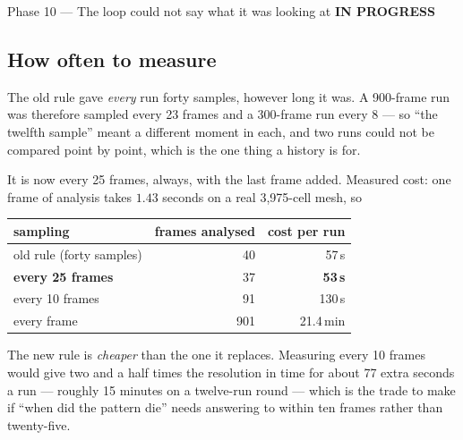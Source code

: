\documentclass[11pt,a4paper]{article}
\newcommand{\prog}{\textcolor{warn}{\textbf{IN PROGRESS}}}
\begin{document}
\begin{phasebox}{Phase 10 --- The loop could not say what it was looking at \hfill \prog}
\subsection*{How often to measure}
The old rule gave \emph{every} run forty samples, however long it was. A 900-frame run was
therefore sampled every 23 frames and a 300-frame run every 8 --- so ``the twelfth sample'' meant a
different moment in each, and two runs could not be compared point by point, which is the one
thing a history is for.

It is now every 25 frames, always, with the last frame added. Measured cost: one frame of analysis
takes $1.43$ seconds on a real 3{,}975-cell mesh, so

\begin{center}\small
\begin{tabular}{@{}lrr@{}}
\toprule
sampling & frames analysed & cost per run \\
\midrule
old rule (forty samples) & 40 & 57\,s \\
\textbf{every 25 frames} & 37 & \textbf{53\,s} \\
every 10 frames & 91 & 130\,s \\
every frame & 901 & 21.4\,min \\
\bottomrule
\end{tabular}
\end{center}

\noindent The new rule is \emph{cheaper} than the one it replaces. Measuring every 10 frames would
give two and a half times the resolution in time for about 77 extra seconds a run --- roughly
15 minutes on a twelve-run round --- which is the trade to make if ``when did the pattern die''
needs answering to within ten frames rather than twenty-five.


\end{phasebox}
\end{document}
